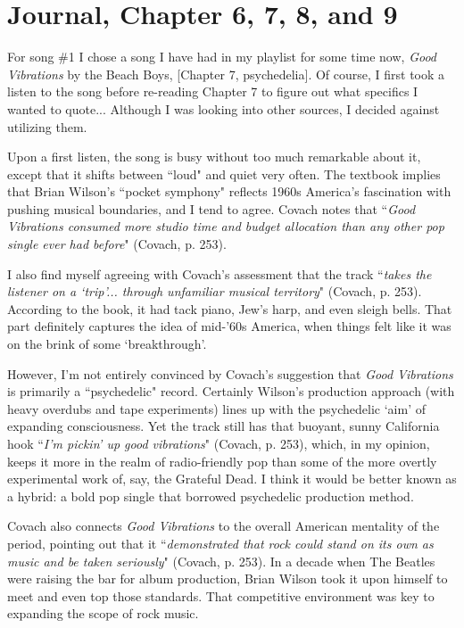 \documentclass[12pt]{article}
\begin{document}
\section*{Journal, Chapter 6, 7, 8, and 9}

For song \#1 I chose a song I have had in my playlist for some time now, 
\textit{Good Vibrations} by the Beach Boys, [Chapter 7, psychedelia].  
Of course, I first took a listen to the song before re-reading Chapter 7 
to figure out what specifics I wanted to quote... Although I was looking into 
other sources, I decided against utilizing them.
\newline

Upon a first listen, the song is busy without too much remarkable about it, 
except that it shifts between ``loud" and quiet very often. The textbook implies 
that Brian Wilson’s ``pocket symphony" reflects 1960s America’s fascination 
with pushing musical boundaries, and I tend to agree. Covach notes that 
``\emph{Good Vibrations consumed more studio time and budget allocation than any other pop single ever had before}" 
(Covach, p. 253). 

I also find myself agreeing with Covach’s assessment that the track 
``\emph{takes the listener on a `trip'... through unfamiliar musical territory}" 
(Covach, p. 253). According to the book, it had tack piano, Jew’s harp, and even sleigh bells. That part definitely captures the idea 
of mid-’60s America, when things felt like it was on the brink of some `breakthrough'.

However, I’m not entirely convinced by Covach’s suggestion that 
\textit{Good Vibrations} is primarily a ``psychedelic" record. Certainly Wilson’s production approach (with heavy overdubs and tape experiments) lines up with the psychedelic `aim' of expanding consciousness. Yet the track still has that buoyant, sunny California 
hook ``\emph{I’m pickin’ up good vibrations}" (Covach, p. 253), which, in my opinion, 
keeps it more in the realm of radio-friendly pop than some of the more overtly 
experimental work of, say, the Grateful Dead. I think it would be better known as a hybrid: a bold pop single that borrowed 
psychedelic production method.

Covach also connects \textit{Good Vibrations} to the overall American mentality 
of the period, pointing out that it ``\emph{demonstrated that rock could stand 
on its own as music and be taken seriously}" (Covach, p. 253). In a decade when The Beatles were raising the bar for album production, Brian 
Wilson took it upon himself to meet and even top those standards. That 
competitive environment was key to expanding the scope of rock music. 
\end{document}

